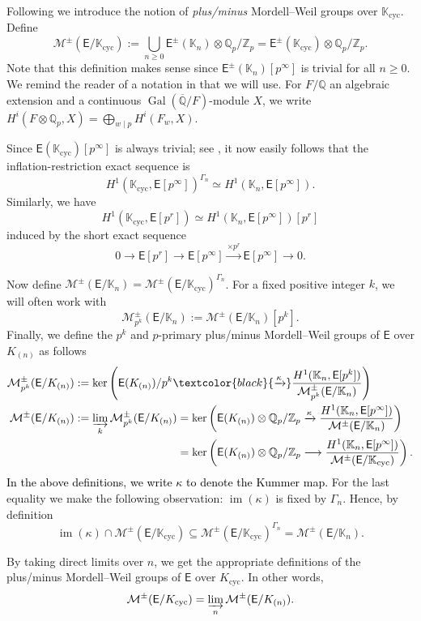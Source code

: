 \documentclass{amsart}
\newcommand{\edit}[1]{\textcolor{black}{#1}}
\numberwithin{equation}{section}
\theoremstyle{remark}
\newcommand{\EC}{\mathsf{E}}
\newcommand{\cM}{\mathcal{M}}
\newcommand{\Gal}{\operatorname{Gal}}
\newcommand{\Qp}{\mathbb{Q}_p}
\newcommand{\Kn}{\mathbb{K}_{n}}
\newcommand{\K}{\mathbb{K}}
\newcommand{\Zp}{\mathbb{Z}_p}
\newcommand{\Q}{\mathbb{Q}}
\newcommand{\cyc}{\operatorname{{cyc}}}
\newcommand{\image}{\operatorname{im}}
\theoremstyle{plain} %
\begin{document}
Following \cite{Lei23} we introduce the notion of \emph{plus/minus} Mordell--Weil groups over $\K_{\cyc}$.
Define
\[
\cM^{\pm}(\EC/\K_{\cyc}) := \bigcup_{n\geq 0} \EC^{\pm}(\Kn) \otimes \Qp/\Zp = \EC^{\pm}(\K_{\cyc}) \otimes \Qp/\Zp.
\]
Note that this definition makes sense since $\EC^{\pm}(\Kn)[p^\infty]$ is trivial for all $n\geq 0$.
We remind the reader of a notation in \cite{Kat21} that we will use.
For $F/\Q$ an algebraic extension and a continuous $\Gal(\overline{\Q}/F)$-module $X$, we write $H^i(F \otimes \Q_{p}, X) = \bigoplus_{w\mid p} H^i(F_w, X)$.

Since $\EC(\K_{\cyc})[p^\infty]$ is always trivial; see \cite[Proposition~3.6]{Kat21}, it now easily follows that the inflation-restriction exact sequence is
\[
H^1\left( \K_{\cyc}, \EC[p^\infty]\right)^{\Gamma_n} \simeq H^1\left( \Kn, \EC[p^\infty]\right).
\]
Similarly, we have 
\[
H^1\left( \K_{\cyc}, \EC[p^r]\right) \simeq H^1\left( \Kn, \EC[p^\infty]\right)[p^r] 
\]
induced by the short exact sequence
\[
0 \longrightarrow \EC[p^r] \longrightarrow \EC[p^\infty] \xrightarrow{\times p^r} \EC[p^\infty] \longrightarrow 0.
\]

Now define $\cM^{\pm}(\EC/\Kn) = \cM^{\pm}(\EC/\K_{\cyc})^{\Gamma_n}$.
For a fixed positive integer $k$, we will often work with 
\[
\cM_{p^k}^{\pm}(\EC/\Kn) := \cM^{\pm}(\EC/\Kn)[p^k].
\]
Finally, we define the $p^k$ and $p$-primary plus/minus Mordell--Weil groups of $\EC$ over $K_{(n)}$ as follows
\begin{align*}
\cM_{p^k}^{\pm}(\EC/K_{(n)}) &:= \ker\left(\EC(K_{(n)})/p^k \edit{\xrightarrow{\kappa}} \frac{H^1(\Kn, \EC[p^k])}{\cM_{p^k}^{\pm}(\EC/\Kn)} \right)\\
\cM^{\pm}(\EC/K_{(n)}) &:= \varinjlim_k \cM_{p^k}^{\pm}(\EC/K_{(n)}) = \ker\left(\EC(K_{(n)}) \otimes \Qp/\Zp \xrightarrow{\kappa} \frac{H^1(\Kn, \EC[p^\infty])}{\cM^{\pm}(\EC/\Kn)} \right)\\
& \hspace{1.27in} = \ker\left(\EC(K_{(n)}) \otimes \Qp/\Zp \longrightarrow \frac{H^1(\Kn, \EC[p^\infty])}{\cM^{\pm}(\EC/\K_{\cyc})} \right).
\end{align*}
\edit{In the above definitions, we write $\kappa$ to denote the Kummer map.}
For the last equality we make the following observation: $\image(\kappa)$ is fixed by $\Gamma_n$.
Hence, by definition
\[
\image(\kappa) \cap \cM^{\pm}(\EC/\K_{\cyc}) \subseteq \cM^{\pm}(\EC/\K_{\cyc})^{\Gamma_n} = \cM^{\pm}(\EC/\Kn).
\]

By taking direct limits over $n$, we get the appropriate definitions of the plus/minus Mordell--Weil groups of $\EC$ over $K_{\cyc}$.
In other words,
\[
\cM^{\pm}(\EC/K_{\cyc}) = \varinjlim_n \cM^{\pm}(\EC/K_{(n)}).
\]
\end{document}
